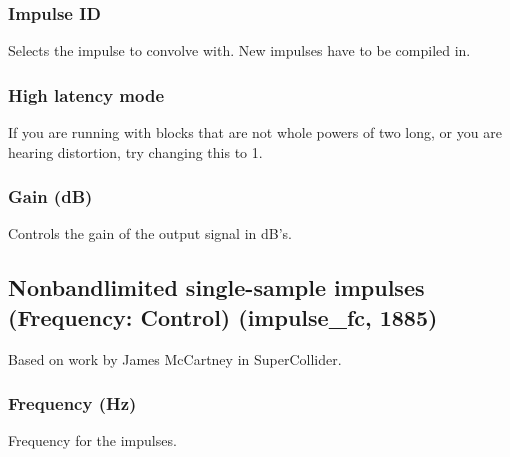 \documentclass[11pt]{article}
\begin{document}
    \subsubsection*{Impulse ID}
Selects the impulse to convolve with. New impulses have to be compiled in.\subsubsection*{High latency mode}
If you are running with blocks that are not whole powers of two long, or you are hearing distortion, try changing this to 1.\subsubsection*{Gain (dB)}
Controls the gain of the output signal in dB's.\subsection{Nonbandlimited single-sample impulses (Frequency: Control) (impulse\_fc, 1885)\label{impulse_fc}\label{id1885}}
Based on work by James McCartney in SuperCollider.\subsubsection*{Frequency (Hz)}

       Frequency for the impulses.
\end{document}

